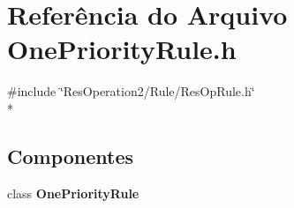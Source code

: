 \section{Referência do Arquivo One\+Priority\+Rule.\+h}
\label{_one_priority_rule_8h}
{\ttfamily \#include \char`\"{}Res\+Operation2/\+Rule/\+Res\+Op\+Rule.\+h\char`\"{}}\\*
\subsection*{Componentes}
\begin{DoxyCompactItemize}
\item 
class {\bf One\+Priority\+Rule}
\end{DoxyCompactItemize}
